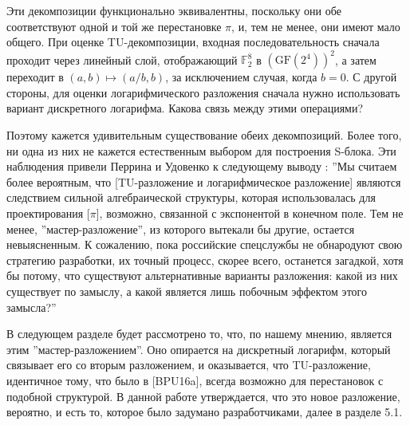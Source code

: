 Эти декомпозиции функционально эквивалентны, поскольку они обе соответствуют одной и той же перестановке \(\pi\), и, тем не менее, они имеют мало общего. При оценке TU-декомпозиции, входная последовательность сначала проходит через линейный слой, отображающий \(\mathbb{F}_2^8\) в \((\text{GF}(2^4))^2\), а затем переходит в \((a, b) \mapsto (a/b, b)\), за исключением случая, когда \(b = 0\). С другой стороны, для оценки логарифмического разложения сначала нужно использовать вариант дискретного логарифма. Какова связь между этими операциями?

Поэтому кажется удивительным существование обеих декомпозиций. Более того, ни одна из них не кажется естественным выбором для построения S-блока. Эти наблюдения привели Перрина и Удовенко к следующему выводу \cite{PU16}: ''Мы считаем более вероятным, что [TU-разложение и логарифмическое разложение] являются следствием сильной алгебраической структуры, которая использовалась для проектирования [\(\pi\)], возможно, связанной с экспонентой в конечном поле. Тем не менее, ''мастер-разложение'', из которого вытекали бы другие, остается невыясненным. К сожалению, пока российские спецслужбы не обнародуют свою стратегию разработки, их точный процесс, скорее всего, останется загадкой, хотя бы потому, что существуют альтернативные варианты разложения: какой из них существует по замыслу, а какой является лишь побочным эффектом этого замысла?''

В следующем разделе будет рассмотрено то, что, по нашему мнению, является этим ''мастер-разложением''. Оно опирается на дискретный логарифм, который связывает его со вторым разложением, и оказывается, что TU-разложение, идентичное тому, что было в [BPU16a], всегда возможно для перестановок с подобной структурой. В данной работе утверждается, что это новое разложение, вероятно, и есть то, которое было задумано разработчиками, далее в разделе 5.1.